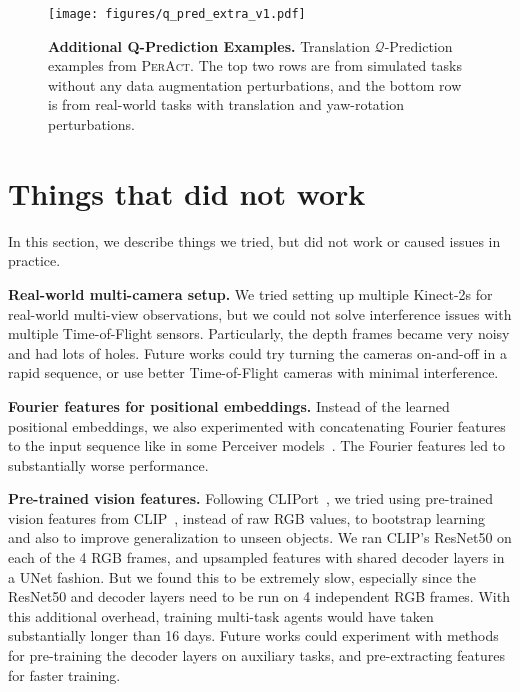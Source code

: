 \documentclass{article}
\newcommand{\model}{\textsc{PerAct}}
\begin{document}
\begin{figure*}[h]
    \centering
    \hspace*{-3.1cm}
    \texttt{[image: figures/q\_pred\_extra\_v1.pdf]}
    \caption{\textbf{Additional Q-Prediction Examples.} Translation $\mathcal{Q}$-Prediction examples from \model. The top two rows are from simulated tasks without any data augmentation perturbations, and the bottom row is from real-world tasks  with translation and yaw-rotation perturbations.}
    \label{fig:qpred_extra}
\end{figure*}
\newpage
\section{Things that did not work}
\vspace{-0.2cm}
In this section, we describe things we tried, but did not work or caused issues in practice. 

\textbf{Real-world multi-camera setup.} We tried setting up multiple Kinect-2s for real-world multi-view observations, but we could not solve interference issues with multiple Time-of-Flight sensors. Particularly, the depth frames became very noisy and had lots of holes. Future works could try turning the cameras on-and-off in a rapid sequence, or use better Time-of-Flight cameras with minimal interference. 

\textbf{Fourier features for positional embeddings.} Instead of the learned positional embeddings, we also experimented with concatenating Fourier features to the input sequence like in some Perceiver models~\citep{jaegle2021perceiver}. The Fourier features led to substantially worse performance. 

\textbf{Pre-trained vision features.} Following CLIPort~\citep{cliport}, we tried using pre-trained vision features from CLIP~\citep{radfordLearningTransferableVisual2021}, instead of raw RGB values, to bootstrap learning and also to improve generalization to unseen objects. We ran CLIP's ResNet50 on each of the 4 RGB frames, and upsampled features with shared  decoder layers in a UNet fashion. But we found this to be extremely slow, especially since the ResNet50 and decoder layers need to be run on 4 independent RGB frames. With this additional overhead, training multi-task agents would have taken substantially longer than 16 days. Future works could experiment with methods for pre-training the decoder layers on auxiliary tasks, and pre-extracting features for faster training. 
\end{document}
